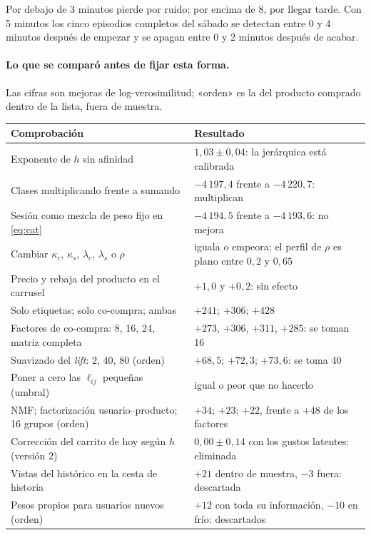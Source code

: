 \documentclass[11pt,a4paper]{article}
\begin{document}
Por debajo de 3 minutos pierde por ruido; por encima de 8, por llegar tarde. Con 5 minutos los cinco
episodios completos del sábado se detectan entre 0 y 4 minutos después de empezar y se apagan entre 0 y
2 minutos después de acabar.

\paragraph{Lo que se comparó antes de fijar esta forma.} Las cifras son mejoras de log-verosimilitud;
«orden» es la del producto comprado dentro de la lista, fuera de muestra.

\begin{center}
\small
\begin{longtable}{@{}p{7.9cm}p{7.4cm}@{}}
\toprule
Comprobación & Resultado\\
\midrule
\endhead
Exponente de $h$ sin afinidad & $1{,}03\pm0{,}04$: la jerárquica está calibrada\\
Clases multiplicando frente a sumando & $-4\,197{,}4$ frente a $-4\,220{,}7$: multiplican\\
Sesión como mezcla de peso fijo en \eqref{eq:cat} & $-4\,194{,}5$ frente a $-4\,193{,}6$: no mejora\\
Cambiar $\kappa_c$, $\kappa_s$, $\lambda_c$, $\lambda_s$ o $\rho$ & iguala o empeora; el perfil de $\rho$ es plano entre $0{,}2$ y $0{,}65$\\
Precio y rebaja del producto en el carrusel & $+1{,}0$ y $+0{,}2$: sin efecto\\
Solo etiquetas; solo co-compra; ambas & $+241$; $+306$; $+428$\\
Factores de co-compra: 8, 16, 24, matriz completa & $+273$, $+306$, $+311$, $+285$: se toman 16\\
Suavizado del \emph{lift}: 2, 40, 80 (orden) & $+68{,}5$; $+72{,}3$; $+73{,}6$: se toma 40\\
Poner a cero las $\ell_{ij}$ pequeñas (umbral) & igual o peor que no hacerlo\\
NMF; factorización usuario--producto; 16 grupos (orden) & $+34$; $+23$; $+22$, frente a $+48$ de los factores\\
Corrección del carrito de hoy según $h$ (versión 2) & $0{,}00\pm0{,}14$ con los gustos latentes: eliminada\\
Vistas del histórico en la cesta de historia & $+21$ dentro de muestra, $-3$ fuera: descartada\\
Pesos propios para usuarios nuevos (orden) & $+12$ con toda su información, $-10$ en frío: descartados\\

\end{longtable}
\end{center}
\end{document}
